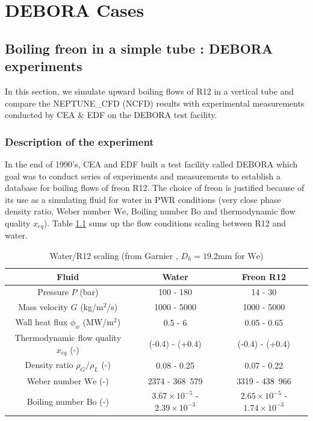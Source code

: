 
\chapter{DEBORA Cases} %

\label{ch:debora} %




\section{Boiling freon in a simple tube : DEBORA experiments}
\label{sec:debora}

In this section, we simulate upward boiling flows of R12 in a vertical tube and compare the NEPTUNE\_CFD  (NCFD) results with experimental measurements conducted by CEA \& EDF on the DEBORA test facility.

\subsection{Description of the experiment}

In the end of 1990's, CEA and EDF built a test facility called DEBORA which goal was to conduct series of experiments and measurements to establish a database for boiling flows of freon R12. The choice of freon is justified because of its use as a simulating fluid for water in PWR conditions (very close phase density ratio, Weber number $\text{We}$, Boiling number $\text{Bo}$ and thermodynamic flow quality $x_{eq}$). Table \ref{tab:simul_fluid} sums up the flow conditions scaling between R12 and water.

\begin{table}[!htb]
\centering
\caption{Water/R12 scaling (from {Garnier} \etal \cite{Garnier2001}, $D_{h}=19.2$mm for $\text{We}$)}
\label{tab:simul_fluid}
\begin{tabular}{|c||c|c|} 
\hline
Fluid & Water & Freon R12 \\
\hline \hline
Pressure $P$ (bar) & 100 - 180 & 14 - 30\\
\hline
Mass velocity $G$ (kg/m$^{2}$/s) & 1000 - 5000 & 1000 - 5000\\
\hline
Wall heat flux $\phi_{w}$ (MW/m$^{2}$) & 0.5 - 6 & 0.05 - 0.65\\ 
\hline
Thermodynamic flow quality $x_{eq}$ (-) & (-0.4) - (+0.4) & (-0.4) - (+0.4)\\
\hline
\hline 
Density ratio $\rho_{G}/\rho_{L}$ (-) & 0.08 - 0.25 & 0.07 - 0.22 \\
\hline
Weber number $\text{We}$ (-) & 2374 - 368~579 & 3319 - 438~966\\
\hline
Boiling number $\text{Bo}$ (-) &  $3.67\times 10^{-5}$ - $2.39\times 10^{-3}$ & $2.65\times 10^{-5}$ - $1.74\times 10^{-3}$\\
\hline
\end{tabular}
\end{table}


